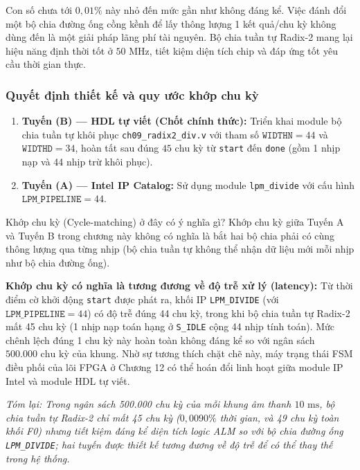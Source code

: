Con số chưa tới $0{,}01\%$ này nhỏ đến mức gần như không đáng kể. Việc đánh đổi một bộ chia đường ống cồng kềnh để lấy thông lượng 1 kết quả/chu kỳ không dùng đến là một giải pháp lãng phí tài nguyên. Bộ chia tuần tự Radix-2 mang lại hiệu năng định thời tốt ở $50\text{ MHz}$, tiết kiệm diện tích chip và đáp ứng tốt yêu cầu thời gian thực.

\subsubsection*{Quyết định thiết kế và quy ước khớp chu kỳ}
\begin{enumerate}[leftmargin=1.5em, itemsep=2pt]
    \item \textbf{Tuyến (B) --- HDL tự viết (Chốt chính thức):} Triển khai module bộ chia tuần tự khôi phục \texttt{ch09\_radix2\_div.v} với tham số $\texttt{WIDTHN} = 44$ và $\texttt{WIDTHD} = 34$, hoàn tất sau đúng $45\text{ chu kỳ}$ từ \texttt{start} đến \texttt{done} (gồm 1 nhịp nạp và 44 nhịp trừ khôi phục).
    \item \textbf{Tuyến (A) --- Intel IP Catalog:} Sử dụng module \texttt{lpm\_divide} với cấu hình $\texttt{LPM\_PIPELINE} = 44$. 
\end{enumerate}

\begin{thoughtqa}{Khớp chu kỳ (Cycle-matching) ở đây có ý nghĩa gì?}
Khớp chu kỳ giữa Tuyến A và Tuyến B trong chương này không có nghĩa là bắt hai bộ chia phải có cùng thông lượng qua từng nhịp (bộ chia tuần tự không thể nhận dữ liệu mới mỗi nhịp như bộ chia đường ống). 

\textbf{Khớp chu kỳ có nghĩa là tương đương về độ trễ xử lý (latency):} Từ thời điểm cờ khởi động \texttt{start} được phát ra, khối IP \texttt{LPM\_DIVIDE} (với $\texttt{LPM\_PIPELINE} = 44$) có độ trễ đúng 44 chu kỳ, trong khi bộ chia tuần tự Radix-2 mất 45 chu kỳ (1 nhịp nạp toán hạng ở \texttt{S\_IDLE} cộng 44 nhịp tính toán). Mức chênh lệch đúng 1 chu kỳ này hoàn toàn không đáng kể so với ngân sách $500.000\text{ chu kỳ}$ của khung. Nhờ sự tương thích chặt chẽ này, máy trạng thái FSM điều phối của lõi FPGA ở Chương 12 có thể hoán đổi linh hoạt giữa module IP Intel và module HDL tự viết.
\end{thoughtqa}

\textit{Tóm lại: Trong ngân sách 500.000 chu kỳ của mỗi khung âm thanh $10\text{ ms}$, bộ chia tuần tự Radix-2 chỉ mất 45 chu kỳ ($0{,}0090\%$ thời gian, và 49 chu kỳ toàn khối F0) nhưng tiết kiệm đáng kể diện tích logic ALM so với bộ chia đường ống \texttt{LPM\_DIVIDE}; hai tuyến được thiết kế tương đương về độ trễ để có thể thay thế trong hệ thống.}

